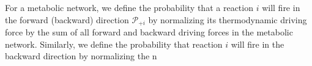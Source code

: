 For a metabolic network, we define the probability that a reaction $i$ will fire in the forward (backward)  direction ${\mathcal P_{+i}}$ by normalizing its thermodynamic driving force by the sum of all forward and backward driving forces in the metabolic network. Similarly, we define the probability that reaction $i$ will fire in the backward direction by normalizing the n